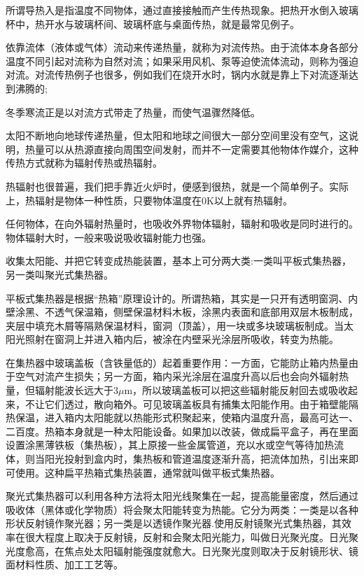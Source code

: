 \documentclass{ctexbook}
\begin{document}
所谓导热入是指温度不同物体，通过直接接触而产生传热现象。把热开水倒入玻璃杯中，热开水与玻璃杯间、玻璃杯底与桌面传热，就是最常见例子。

依靠流体（液体或气体）流动来传递热量，就称为对流传热。由于流体本身各部分温度不同引起对流称为自然对流；如果采用风机、泵等迫使流体流动，则称为强迫对流。对流传热例子也很多，例如我们在烧开水时，锅内水就是靠上下对流逐渐达到沸腾的;

冬季寒流正是以对流方式带走了热量，而使气温骤然降低。

太阳不断地向地球传递热量，但太阳和地球之间很大一部分空间里没有空气，这说明，热量可以从热源直接向周围空间发射，而并不一定需要其他物体作媒介，这种传热方式就称为辐射传热或热辐射。

热辐射也很普遍，我们把手靠近火炉时，便感到很热，就是一个简单例子。实际上，热辐射是物体一种性质，只要物体温度在0K以上就有热辐射。

任何物体，在向外辐射热量时，也吸收外界物体辐射，辐射和吸收是同时进行的。物体辐射大时，一般来吸说吸收辐射能力也强。

收集太阳能、并把它转变成热能装置，基本上可分两大类:一类叫平板式集热器，另一类叫聚光式集热器。

平板式集热器是根据“热箱”原理设计的。所谓热箱，其实是一只开有透明窗洞、内壁涂黑、不透气保温箱，侧壁保温材料木板，涂黑内表面和底部用双层木板制成，夹层中填充木屑等隔熟保温材料，窗洞（顶盖），用一块或多块玻璃板制成。当太阳光照射在窗洞上并进入箱内后，被涂在内壁采光涂层所吸收，转变为热能。

在集热器中玻璃盖板（含铁量低的）起着重要作用：一方面，它能防止箱内热量由于空气对流产生损失；另一方面，箱内采光涂层在温度升高以后也会向外辐射热量，但辐射能波长远大于3$\mu$m，所以玻璃盖板可以把这些辐射能反射回去或吸收起来，不让它们透过，散向箱外。可见玻璃盖板具有捕集太阳能作用。由于箱壁能隔热保温，进入箱内太阳能就以热能形式积聚起来，使箱内温度升高，最高可达一、二百度。热箱本身就是一种太阳能设备。如果加以改装，做成扁平盒子，再在里面设置涂黑薄铁板（集热板），其上原接一些金属管道，充以水或空气等待加热流体，则当阳光投射到盒内时，集热板和管道温度逐渐升高，把流体加热，引出来即可使用。这种扁平热箱式集热装置，通常就叫做平板式集热器。

聚光式集热器可以利用各种方法将太阳光线聚集在一起，提高能量密度，然后通过吸收体（黑体或化学物质）将会聚太阳能转变为热能。它分为两类：一类是以各种形状反射镜作聚光器；另一类是以透镜作聚光器.使用反射镜聚光式集热器，其效率在很大程度上取决于反射镜，反射和会聚太阳光能力，叫做日光聚光度。日光聚光度愈高，在焦点处太阳辐射能强度就愈大。日光聚光度则取决于反射镜形状、镜面材料性质、加工工艺等。
\end{document}
